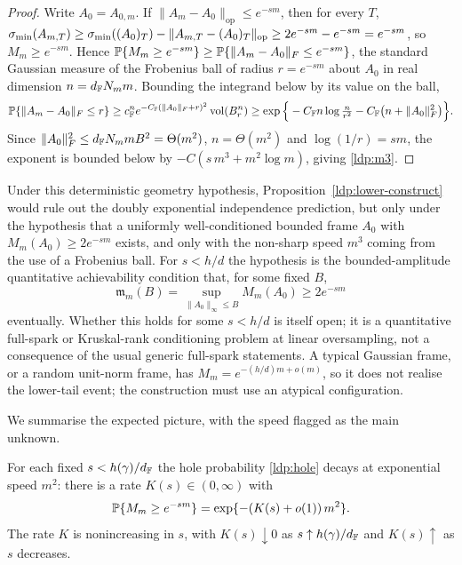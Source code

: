 \begin{proof}
Write \(A_0=A_{0,m}\).  If \(\|A_m-A_0\|_{\mathrm{op}}\le e^{-sm}\), then for
every \(T\),
\(\sigma_{\min}(A_{m,T})\ge \sigma_{\min}((A_0)_T)-\|A_{m,T}-(A_0)_T\|_{\mathrm{op}}\ge
2e^{-sm}-e^{-sm}=e^{-sm}\), so \(M_m\ge e^{-sm}\).  Hence
\(\mathbb{P}\{M_m\ge e^{-sm}\}\ge\mathbb{P}\{\|A_m-A_0\|_{F}\le e^{-sm}\}\), the standard
Gaussian measure of the Frobenius ball of radius \(r=e^{-sm}\) about \(A_0\) in
real dimension \(n=d_{\mathbb{F}} N_m m\).  Bounding the integrand below by its value on the
ball,
\[
  \mathbb{P}\{\|A_m-A_0\|_{F}\le r\}
  \ge c_{\mathbb{F}}^n e^{-C_{\mathbb{F}}(\|A_0\|_F+r)^2}\,\mathrm{vol}(B_r^{n})
  \ge \exp\Big\{-C_{\mathbb{F}} n\log\tfrac{n}{r^2}
       -C_{\mathbb{F}}\big(n+\|A_0\|_F^2\big)\Big\}.
\]
Since \(\|A_0\|_F^2\le d_{\mathbb{F}} N_m m B^2=\Theta(m^2)\), \(n=\Theta(m^2)\) and
\(\log(1/r)=sm\), the exponent is bounded below by
\(-C(s\,m^3+m^2\log m)\), giving \eqref{ldp:m3}.
\end{proof}

Under this deterministic geometry hypothesis,
Proposition~\ref{ldp:lower-construct} would rule out the doubly exponential
independence prediction, but only under the hypothesis that a uniformly
well-conditioned bounded frame \(A_0\) with \(M_m(A_0)\ge 2e^{-sm}\) exists, and
only with the non-sharp speed \(m^3\) coming from the use of a Frobenius ball.
For \(s<h/d\) the hypothesis is the bounded-amplitude quantitative
achievability condition that, for some fixed \(B\),
\[
  \mathfrak m_m(B)=
  \sup_{\|A_0\|_\infty\le B} M_m(A_0)
  \ge 2e^{-sm}
\]
eventually.  Whether this holds for some \(s<h/d\) is itself open; it is a
quantitative full-spark or Kruskal-rank conditioning problem at linear
oversampling, not a consequence of the usual generic full-spark statements.
A typical Gaussian frame, or a random unit-norm frame, has
\(M_m=e^{-(h/d)m+o(m)}\), so it does not realise the lower-tail event; the
construction must use an atypical configuration.

We summarise the expected picture, with the speed flagged as the main unknown.

\begin{conjecture}\label{ldp:lower-rate}
For each fixed \(s<h(\gamma)/d_{\mathbb{F}}\) the hole probability \eqref{ldp:hole} decays at
exponential speed \(m^{2}\): there is a rate \(K(s)\in(0,\infty)\) with
\begin{equation}\label{ldp:Krate}
  \mathbb{P}\{M_m\ge e^{-sm}\}=\exp\{-(K(s)+o(1))\,m^{2}\}.
\end{equation}
The rate \(K\) is nonincreasing in \(s\), with \(K(s)\downarrow0\) as \(s\uparrow
h(\gamma)/d_{\mathbb{F}}\) and \(K(s)\uparrow\) as \(s\) decreases.
\end{conjecture}

